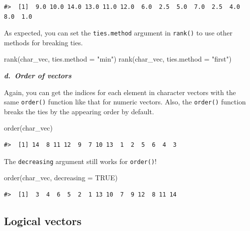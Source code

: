 \documentclass[
]{book}
\newenvironment{Shaded}{\begin{snugshade}}{\end{snugshade}}
\newcommand{\AttributeTok}[1]{\textcolor[rgb]{0.77,0.63,0.00}{#1}}
\newcommand{\ConstantTok}[1]{\textcolor[rgb]{0.00,0.00,0.00}{#1}}
\newcommand{\FunctionTok}[1]{\textcolor[rgb]{0.00,0.00,0.00}{#1}}
\newcommand{\NormalTok}[1]{#1}
\newcommand{\StringTok}[1]{\textcolor[rgb]{0.31,0.60,0.02}{#1}}
\begin{document}
\begin{verbatim}
#>  [1]  9.0 10.0 14.0 13.0 11.0 12.0  6.0  2.5  5.0  7.0  2.5  4.0  8.0  1.0
\end{verbatim}

As expected, you can set the \texttt{ties.method} argument in \texttt{rank()} to use other methods for breaking ties.

\begin{Shaded}
\begin{Highlighting}[]
\FunctionTok{rank}\NormalTok{(char\_vec, }\AttributeTok{ties.method =} \StringTok{"min"}\NormalTok{)}
\FunctionTok{rank}\NormalTok{(char\_vec, }\AttributeTok{ties.method =} \StringTok{"first"}\NormalTok{)}
\end{Highlighting}
\end{Shaded}

\textbf{\emph{d.~Order of vectors}}

Again, you can get the indices for each element in character vectors with the same \texttt{order()} function like that for numeric vectors. Also, the \texttt{order()} function breaks the ties by the appearing order by default.

\begin{Shaded}
\begin{Highlighting}[]
\FunctionTok{order}\NormalTok{(char\_vec)}
\end{Highlighting}
\end{Shaded}

\begin{verbatim}
#>  [1] 14  8 11 12  9  7 10 13  1  2  5  6  4  3
\end{verbatim}

The \texttt{decreasing} argument still works for \texttt{order()}!

\begin{Shaded}
\begin{Highlighting}[]
\FunctionTok{order}\NormalTok{(char\_vec, }\AttributeTok{decreasing =} \ConstantTok{TRUE}\NormalTok{)}
\end{Highlighting}
\end{Shaded}

\begin{verbatim}
#>  [1]  3  4  6  5  2  1 13 10  7  9 12  8 11 14
\end{verbatim}

\hypertarget{logical-vectors}{%
\subsection{Logical vectors}\label{logical-vectors}}
\end{document}
